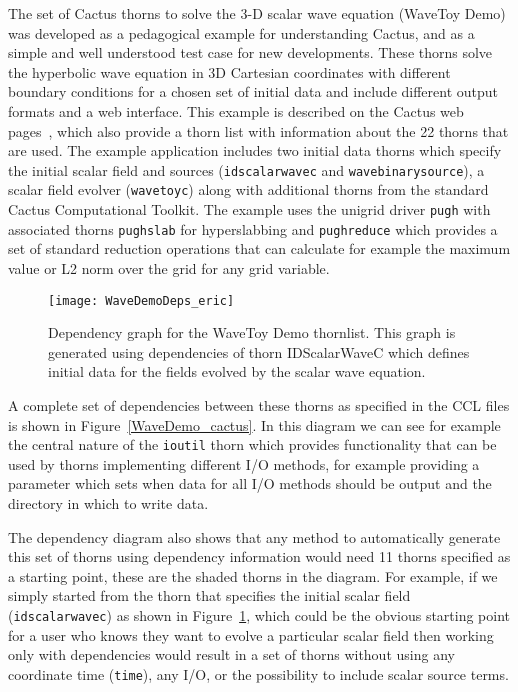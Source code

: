 \documentclass[conference]{IEEEtran}
\begin{document}
The set of Cactus thorns to solve the 3-D scalar wave equation (WaveToy Demo) was developed as a pedagogical example 
for understanding Cactus, and as a simple and well understood test case for new developments. These
thorns solve the hyperbolic wave equation in 3D Cartesian coordinates with different boundary conditions for a chosen set of initial data and include 
different output formats and a web interface. This example is described 
on the Cactus web pages~\cite{Cactusweb}, which also provide a thorn list with information about the 22 thorns that are used. 
The example application includes two initial data thorns which specify the initial scalar field and sources ({\tt idscalarwavec} and {\tt wavebinarysource}), 
a scalar field evolver ({\tt wavetoyc}) along with additional 
thorns from the standard Cactus Computational Toolkit. 
The example uses the unigrid driver {\tt pugh} with associated thorns {\tt pughslab} for 
hyperslabbing and {\tt pughreduce} which provides a set of standard reduction operations that can calculate for example 
the maximum value or L2 norm over the grid for any grid variable. 
 


\begin{figure}[h]
\centering
\texttt{[image: WaveDemoDeps\_eric]}
\label{WaveDemo_eric}
\caption{Dependency graph for the WaveToy Demo thornlist. This graph is generated using dependencies of thorn IDScalarWaveC which defines initial data for 
the fields evolved by the scalar wave equation.}
\end{figure}

 A complete set of dependencies between 
these thorns as specified in the CCL files is shown in Figure~\ref{WaveDemo_cactus}. In this diagram
we can see for example the central nature of the {\tt ioutil} thorn which provides functionality 
that can be used by thorns implementing different I/O methods, for example providing a parameter
which sets when data for all I/O methods should be output and the directory in which to write data.

The dependency diagram also shows that any method to automatically generate this set of thorns 
using dependency information would need 11 thorns specified as a starting point, these are the shaded
thorns in the diagram. For example, if we simply started from the thorn that specifies the 
initial scalar field ({\tt idscalarwavec}) as shown in Figure~\ref{WaveDemo_eric}, which could be 
the obvious starting point for 
a user who knows they want to evolve a particular scalar field then working only with dependencies 
would result in a set of thorns without using any coordinate time ({\tt time}), any I/O, or the possibility to include scalar source terms.
\end{document}
